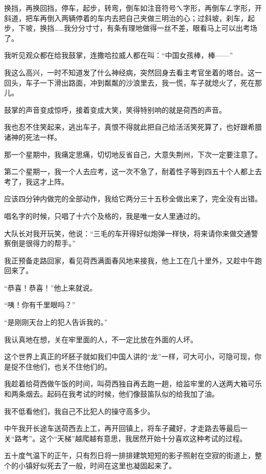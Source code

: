 \par 换挡，再换回挡，停车，起步，转弯，倒车如注音符号ㄟ字形，再倒车ㄥ字形，开斜道，把车再倒入两辆停着的车内去把自己夹做三明治的心；过斜坡，刹车，起步，下坡，换挡……我分分寸寸，有条有理地做得一丝不差，眼看马上可以出考场了。
\par 我听见观众都在给我鼓掌，连撒哈拉威人都在叫：“中国女孩棒，棒——”
\par 我这么高兴，一时不知道发了什么神经病，突然回身去看主考官坐着的塔台。这一回头，车子一下滑出路面，冲到粼粼的沙浪里去，我一慌，车子就熄火了，死在那儿。
\par 鼓掌的声音变成惊呼，接着变成大笑，笑得特别响的就是荷西的声音。
\par 我也忍不住笑起来，逃出车子，真恨不得就此把自己给活活笑死算了，也好跟希腊诸神的死法一样。
\par 那一个星期中，我痛定思痛，切切地反省自己，大意失荆州，下次一定要注意了。
\par 第二个星期一，我一个人去应考，这一次不急了，耐着性子等到四五十个人都上去考了，我这才上阵。
\par 应该四分钟内做完的全部动作，我给它两分三十五秒全做出来了，完全没有出错。
\par 唱名字的时候，只唱了十六个及格的，我是唯一女人里通过的。
\par 大队长对我开玩笑，他说：“三毛的车开得好似炮弹一样快，将来请你来做交通警察倒是很得力的帮手。”
\par 我正预备走路回家，看见荷西满面春风地来接我，他上工在几十里外，又趁中午跑回来了。
\par “恭喜！恭喜！”他上来就说。
\par “咦！你有千里眼吗？”
\par “是刚刚天台上的犯人告诉我的。”
\par 我认真地在想，关在牢里面的人，不一定比放在外面的人坏。
\par 这个世界上真正的坏胚子就如我们中国人讲的“龙”一样，可大可小，可隐可现，你是捉不住他们，也关不住他们的。
\par 我趁着给荷西做午饭的时间，叫荷西独自再去跑一趟，给监牢里的人送两大箱可乐和两条烟去。起码在我考试的时候，他们像鼓笛队似的给我加了油。
\par 我不低看他们，我自己不比犯人的操守高多少。
\par 中午我开长途车送荷西去上工，再开回镇上，将车子藏好，才走路去等最后一关“路考”。这个“天梯”越爬越有意思，我居然开始十分喜欢这种考试的过程。
\par 五十度气温下的正午，只有烈日将一排排建筑短短的影子照射在空寂的街道上，整个的小镇好似死去了一般，时间在这里也凝固起来了。

